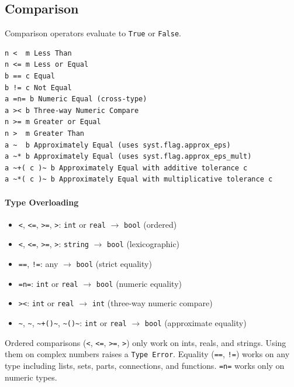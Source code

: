 \subsection{Comparison}
Comparison operators evaluate to \texttt{True} or \texttt{False}.
\begin{verbatim}
n <  m Less Than
n <= m Less or Equal
b == c Equal
b != c Not Equal
a =n= b Numeric Equal (cross-type)
a >< b Three-way Numeric Compare
n >= m Greater or Equal
n >  m Greater Than
a ~  b Approximately Equal (uses syst.flag.approx_eps)
a ~* b Approximately Equal (uses syst.flag.approx_eps_mult)
a ~+( c )~ b Approximately Equal with additive tolerance c
a ~*( c )~ b Approximately Equal with multiplicative tolerance c
\end{verbatim}

\paragraph{Type Overloading}
\begin{itemize}
\item \texttt{<}, \texttt{<=}, \texttt{>=}, \texttt{>}: \texttt{int} or \texttt{real} $\rightarrow$ \texttt{bool} (ordered)
\item \texttt{<}, \texttt{<=}, \texttt{>=}, \texttt{>}: \texttt{string} $\rightarrow$ \texttt{bool} (lexicographic)
\item \texttt{==}, \texttt{!=}: any $\rightarrow$ \texttt{bool} (strict equality)
\item \texttt{=n=}: \texttt{int} or \texttt{real} $\rightarrow$ \texttt{bool} (numeric equality)
\item \texttt{><}: \texttt{int} or \texttt{real} $\rightarrow$ \texttt{int} (three-way numeric compare)
\item \texttt{\textasciitilde}, \texttt{\textasciitilde*}, \texttt{\textasciitilde+()\textasciitilde}, \texttt{\textasciitilde*()\textasciitilde}: \texttt{int} or \texttt{real} $\rightarrow$ \texttt{bool} (approximate equality)
\end{itemize}

Ordered comparisons (\texttt{<}, \texttt{<=}, \texttt{>=}, \texttt{>}) only work on ints, reals, and strings. Using them on complex numbers raises a \texttt{Type Error}. Equality (\texttt{==}, \texttt{!=}) works on any type including lists, sets, parts, connections, and functions. \texttt{=n=} works only on numeric types.

